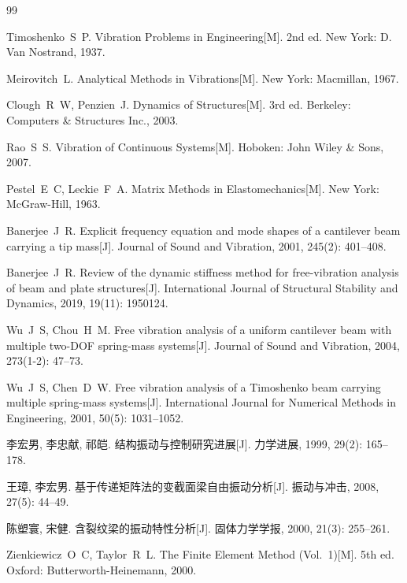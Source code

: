 \documentclass[twoside,12pt]{ctexart}
\begin{document}
\begin{thebibliography}{99}

Timoshenko~S~P. Vibration Problems in Engineering[M]. 2nd ed. New York: D. Van
Nostrand, 1937.

Meirovitch~L. Analytical Methods in Vibrations[M]. New York: Macmillan, 1967.

Clough~R~W, Penzien~J. Dynamics of Structures[M]. 3rd ed. Berkeley: Computers
\& Structures Inc., 2003.

Rao~S~S. Vibration of Continuous Systems[M]. Hoboken: John Wiley \& Sons, 2007.

Pestel~E~C, Leckie~F~A. Matrix Methods in Elastomechanics[M]. New York:
McGraw-Hill, 1963.

Banerjee~J~R. Explicit frequency equation and mode shapes of a cantilever beam
carrying a tip mass[J]. Journal of Sound and Vibration, 2001, 245(2): 401--408.

Banerjee~J~R. Review of the dynamic stiffness method for free-vibration analysis
of beam and plate structures[J]. International Journal of Structural Stability
and Dynamics, 2019, 19(11): 1950124.

Wu~J~S, Chou~H~M. Free vibration analysis of a uniform cantilever beam with
multiple two-DOF spring-mass systems[J]. Journal of Sound and Vibration, 2004,
273(1-2): 47--73.

Wu~J~S, Chen~D~W. Free vibration analysis of a Timoshenko beam carrying multiple
spring-mass systems[J]. International Journal for Numerical Methods in
Engineering, 2001, 50(5): 1031--1052.

李宏男, 李忠献, 祁皑. 结构振动与控制研究进展[J]. 力学进展, 1999, 29(2): 165--178.

王璋, 李宏男. 基于传递矩阵法的变截面梁自由振动分析[J]. 振动与冲击, 2008,
27(5): 44--49.

陈塑寰, 宋健. 含裂纹梁的振动特性分析[J]. 固体力学学报, 2000, 21(3): 255--261.

Zienkiewicz~O~C, Taylor~R~L. The Finite Element Method (Vol.~1)[M]. 5th ed.
Oxford: Butterworth-Heinemann, 2000.


\end{thebibliography}
\end{document}
